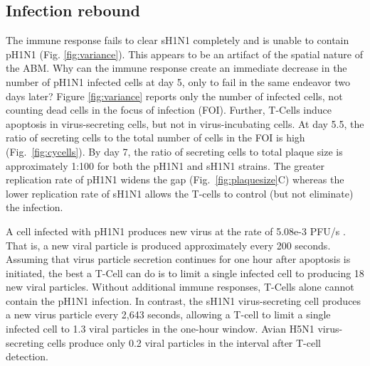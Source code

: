\documentclass[10pt]{article}
\begin{document}
\subsection*{Infection rebound}


The immune response fails to clear sH1N1 completely and is unable to contain pH1N1 (Fig. \ref{fig:variance}).  This appears to be an artifact of the spatial nature of the ABM.  Why can the immune response create an immediate decrease in the number of pH1N1 infected cells at day 5, only to fail in the same endeavor two days later?   Figure \ref{fig:variance} reports only the number of infected cells, not counting dead cells in the focus of infection (FOI).  Further, T-Cells induce apoptosis in virus-secreting cells, but not in virus-incubating cells.  At day 5.5, the ratio of secreting cells to the total number of cells in the FOI is high (Fig.~\ref{fig:cycells}). By day 7, the ratio of secreting cells to total plaque size is approximately 1:100 for both the pH1N1 and sH1N1 strains.  The greater replication rate of pH1N1 widens the gap (Fig.~\ref{fig:plaquesize}C) whereas the lower replication rate of sH1N1 allows the T-cells to control (but not eliminate) the infection.

A cell infected with pH1N1 produces new virus at the rate of 5.08e-3 PFU/s \cite{Mitchell2011}.  That is, a new viral particle is produced approximately every 200 seconds.  Assuming that virus particle secretion continues for one hour after apoptosis is initiated, the best a T-Cell can do is to limit a single infected cell to producing 18 new viral particles.  Without additional immune responses, T-Cells alone cannot contain the pH1N1 infection.  In contrast, the sH1N1 virus-secreting cell produces a new virus particle every 2,643 seconds, allowing a T-cell to limit a single infected cell to 1.3 viral particles in the one-hour window.  Avian H5N1 virus-secreting cells produce only 0.2 viral particles in the interval after T-cell detection. 
\end{document}
